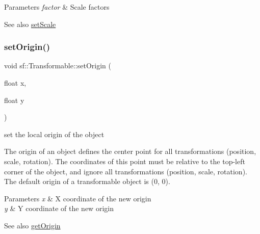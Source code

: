 \begin{DoxyParams}{Parameters}
{\em factor} & Scale factors\\
\hline
\end{DoxyParams}
\begin{DoxySeeAlso}{See also}
\hyperlink{classsf_1_1_transformable_aaec50b46b3f41b054763304d1e727471}{set\+Scale} 
\end{DoxySeeAlso}
\mbox{\label{classsf_1_1_transformable_a56c67bd80aae8418d13fb96c034d25ec}} 
\subsubsection{\texorpdfstring{set\+Origin()}{setOrigin()}\hspace{0.1cm}{\footnotesize\ttfamily [1/2]}}
{\footnotesize\ttfamily void sf\+::\+Transformable\+::set\+Origin (\begin{DoxyParamCaption}\item[{float}]{x,  }\item[{float}]{y }\end{DoxyParamCaption})}



set the local origin of the object 

The origin of an object defines the center point for all transformations (position, scale, rotation). The coordinates of this point must be relative to the top-\/left corner of the object, and ignore all transformations (position, scale, rotation). The default origin of a transformable object is (0, 0).


\begin{DoxyParams}{Parameters}
{\em x} & X coordinate of the new origin \\
\hline
{\em y} & Y coordinate of the new origin\\
\hline
\end{DoxyParams}
\begin{DoxySeeAlso}{See also}
\hyperlink{classsf_1_1_transformable_a37ea3500afac234814a43ce809ef264e}{get\+Origin} 
\end{DoxySeeAlso}
\mbox{\label{classsf_1_1_transformable_aa93a835ffbf3bee2098dfbbc695a7f05}} 
